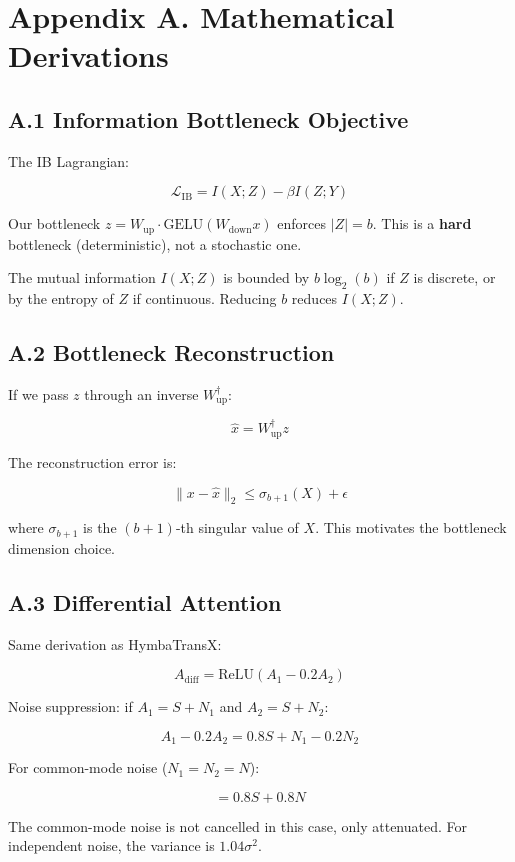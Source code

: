 \section{Appendix A. Mathematical Derivations}

\subsection{A.1 Information Bottleneck Objective}

The IB Lagrangian:

\[
\mathcal{L}_\text{IB} = I(X; Z) - \beta I(Z; Y)
\tag{A.1}
\]

Our bottleneck $z = W_\text{up} \cdot \text{GELU}(W_\text{down} x)$ 
enforces $|Z| = b$. This is a \textbf{hard} bottleneck (deterministic), not a 
stochastic one.

The mutual information $I(X; Z)$ is bounded by $b \log_2(b)$ if $Z$ is 
discrete, or by the entropy of $Z$ if continuous. Reducing $b$ reduces 
$I(X; Z)$.

\subsection{A.2 Bottleneck Reconstruction}

If we pass $z$ through an inverse $W_\text{up}^\dagger$:

\[
\hat{x} = W_\text{up}^\dagger z
\tag{A.2}
\]

The reconstruction error is:

\[
\|x - \hat{x}\|_2 \leq \sigma_{b+1}(X) + \epsilon
\tag{A.3}
\]

where $\sigma_{b+1}$ is the $(b+1)$-th singular value of $X$. This 
motivates the bottleneck dimension choice.

\subsection{A.3 Differential Attention}

Same derivation as HymbaTransX:

\[
A_\text{diff} = \text{ReLU}(A_1 - 0.2 A_2)
\tag{A.4}
\]

Noise suppression: if $A_1 = S + N_1$ and $A_2 = S + N_2$:

\[
A_1 - 0.2 A_2 = 0.8 S + N_1 - 0.2 N_2
\tag{A.5}
\]

For common-mode noise ($N_1 = N_2 = N$):

\[
= 0.8 S + 0.8 N
\tag{A.6}
\]

The common-mode noise is not cancelled in this case, only attenuated. For 
independent noise, the variance is $1.04 \sigma^2$.

